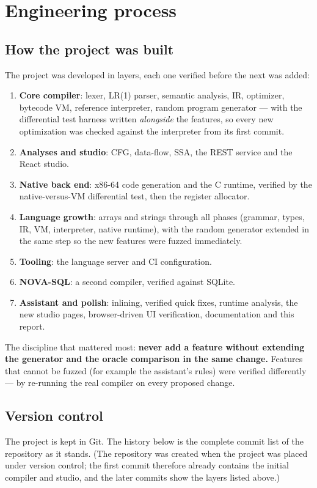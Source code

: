 \chapter{Engineering process}
\label{ch:process}

\section{How the project was built}
The project was developed in layers, each one verified before the next was added:

\begin{enumerate}
  \item \textbf{Core compiler}: lexer, LR(1) parser, semantic analysis, IR, optimizer, bytecode VM, reference interpreter, random program generator --- with the differential test harness written \emph{alongside} the features, so every new optimization was checked against the interpreter from its first commit.
  \item \textbf{Analyses and studio}: CFG, data-flow, SSA, the REST service and the React studio.
  \item \textbf{Native back end}: x86-64 code generation and the C runtime, verified by the native-versus-VM differential test, then the register allocator.
  \item \textbf{Language growth}: arrays and strings through all phases (grammar, types, IR, VM, interpreter, native runtime), with the random generator extended in the same step so the new features were fuzzed immediately.
  \item \textbf{Tooling}: the language server and CI configuration.
  \item \textbf{NOVA-SQL}: a second compiler, verified against SQLite.
  \item \textbf{Assistant and polish}: inlining, verified quick fixes, runtime analysis, the new studio pages, browser-driven UI verification, documentation and this report.
\end{enumerate}

\begin{keybox}
The discipline that mattered most: \textbf{never add a feature without extending the generator and the oracle comparison in the same change.} Features that cannot be fuzzed (for example the assistant's rules) were verified differently --- by re-running the real compiler on every proposed change.
\end{keybox}

\section{Version control}
The project is kept in Git. The history below is the complete commit list of the repository as it stands. (The repository was created when the project was placed under version control; the first commit therefore already contains the initial compiler and studio, and the later commits show the layers listed above.)

